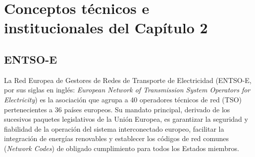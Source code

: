 
\chapter{Conceptos técnicos e institucionales del Capítulo 2}
\label{anexo:conceptos_cap2}

\section{ENTSO-E}
\label{anexo:entsoe}
La Red Europea de Gestores de Redes de Transporte de Electricidad (ENTSO-E, por sus siglas en inglés: \textit{European Network of Transmission System Operators for Electricity}) es la asociación que agrupa a 40 operadores técnicos de red (TSO) pertenecientes a 36 países europeos. Su mandato principal, derivado de los sucesivos paquetes legislativos de la Unión Europea, es garantizar la seguridad y fiabilidad de la operación del sistema interconectado europeo, facilitar la integración de energías renovables y establecer los códigos de red comunes (\textit{Network Codes}) de obligado cumplimiento para todos los Estados miembros.